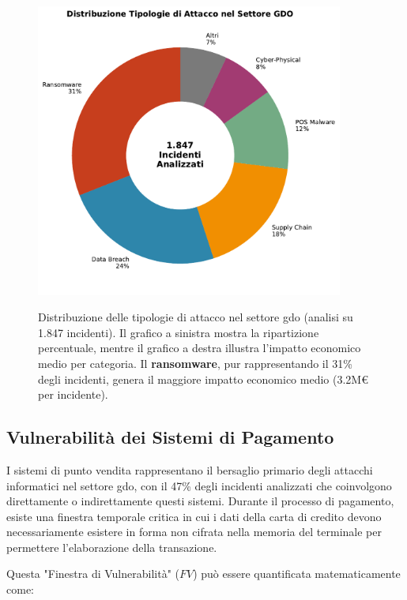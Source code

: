 \begin{figure}[htbp]
\centering
\includegraphics[width=0.9\textwidth]{thesis_figures/cap2/fig_2_2_attack_types.pdf}
\caption[Distribuzione delle tipologie di attacco nel settore GDO]{Distribuzione delle tipologie di attacco nel settore \gls{gdo} (analisi su 1.847 incidenti). Il grafico a sinistra mostra la ripartizione percentuale, mentre il grafico a destra illustra l'impatto economico medio per categoria. Il \textbf{\gls{ransomware}}, pur rappresentando il 31\% degli incidenti, genera il maggiore impatto economico medio (3.2M€ per incidente).}\autocite{CPR2025}
\label{fig:attack_types}
\end{figure}

\subsection{\texorpdfstring{Vulnerabilità dei Sistemi di Pagamento}{2.3.1 - Vulnerabilità dei Sistemi di Pagamento}}

I sistemi di punto vendita rappresentano il bersaglio primario degli attacchi informatici nel settore \gls{gdo}, con il 47\% degli incidenti analizzati che coinvolgono direttamente o indirettamente questi sistemi. Durante il processo di pagamento, esiste una finestra temporale critica in cui i dati della carta di credito devono necessariamente esistere in forma non cifrata nella memoria del terminale per permettere l'elaborazione della transazione.

Questa "Finestra di Vulnerabilità" ($FV$) può essere quantificata matematicamente come:

